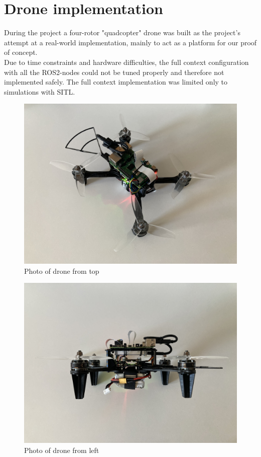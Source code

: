\newpage
\newpage

\section{Drone implementation}
\label{drone_impl}

During the project a four-rotor "quadcopter" drone was built as the project's attempt at a real-world implementation, mainly to act as a platform for our proof of concept.\\
Due to time constraints and hardware difficulties, the full context configuration with all the ROS2-nodes could not be tuned properly and therefore not implemented safely. The full context implementation was limited only to simulations with SITL.

\begin{figure}[!htb]
    \centering
    \includegraphics[width=\textwidth]{fig/drone/drone_top.jpg}
    \caption{Photo of drone from top}
\end{figure}

\newpage

\begin{figure}[!htb]
    \centering
    \includegraphics[width=\textwidth]{fig/drone/drone_left.jpg}
    \caption{Photo of drone from left}
\end{figure}

